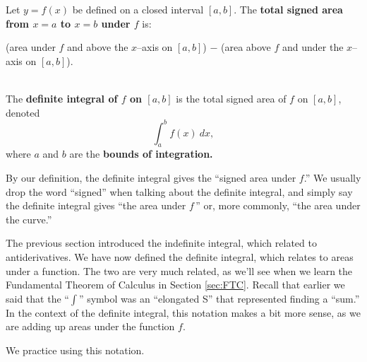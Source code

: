 {Let $y=f(x)$ be defined on a closed interval $[a,b]$. The \textbf{total signed area from $x=a$ to $x=b$ under $f$} is:

\noindent\parbox{\specialboxlength}{\centering (area  under $f$ and above the $x$--axis on $[a,b]$) $-$ (area above $f$ and under the $x$--axis on $[a,b]$).}\\

The \textbf{definite integral of $f$ on $[a,b]$} is the total signed area of $f$ on $[a,b]$, denoted $$\int_a^b f(x)\ dx,$$
where $a$ and $b$ are the \textbf{bounds of integration.}
}

By our definition, the definite integral gives the ``signed area under $f$.'' We usually drop the word ``signed'' when talking about the definite integral, and simply say the definite integral gives ``the area under $f$\,'' or, more commonly, ``the area under the curve.''

The previous section introduced the indefinite integral, which related to antiderivatives. We have now defined the definite integral, which relates to areas under a function. The two are very much related, as we'll see when we learn the Fundamental Theorem of Calculus in Section \ref{sec:FTC}. Recall that earlier we said that the ``$\int$'' symbol was an ``elongated S'' that represented finding a ``sum.'' In the context of the definite integral, this notation makes a bit more sense, as we are adding up areas under the function $f$.

We practice using this notation.\\

